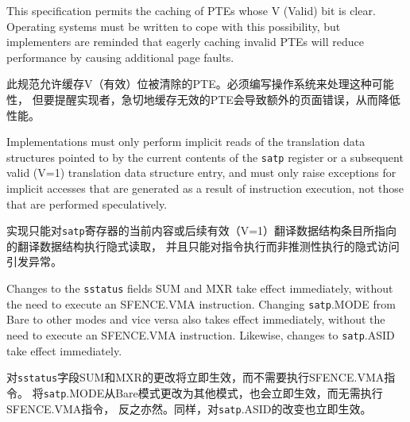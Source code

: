 \begin{commentary}

This specification permits the caching of PTEs whose V (Valid) bit is clear.
Operating systems must be written to cope with this possibility, but implementers
are reminded that eagerly caching invalid PTEs will reduce performance by causing
additional page faults.

此规范允许缓存V（有效）位被清除的PTE。必须编写操作系统来处理这种可能性，
但要提醒实现者，急切地缓存无效的PTE会导致额外的页面错误，从而降低性能。  
\end{commentary}

Implementations must only perform implicit reads of the translation
data structures pointed to by the current contents of the {\tt satp}
register or a subsequent valid (V=1) translation data structure entry,
and must only raise exceptions for implicit accesses that are
generated as a result of instruction execution, not those that are
performed speculatively.

实现只能对{\tt satp}寄存器的当前内容或后续有效（V=1）翻译数据结构条目所指向的翻译数据结构执行隐式读取，
并且只能对指令执行而非推测性执行的隐式访问引发异常。

Changes to the {\tt sstatus} fields SUM and MXR take effect immediately,
without the need to execute an SFENCE.VMA instruction.
Changing {\tt satp}.MODE from Bare to other modes and vice versa also
takes effect immediately, without the need to execute an SFENCE.VMA
instruction.
Likewise, changes to {\tt satp}.ASID take effect immediately.

对{\tt sstatus}字段SUM和MXR的更改将立即生效，而不需要执行SFENCE.VMA指令。
将{\tt satp}.MODE从Bare模式更改为其他模式，也会立即生效，而无需执行SFENCE.VMA指令，
反之亦然。同样，对{\tt satp}.ASID的改变也立即生效。


